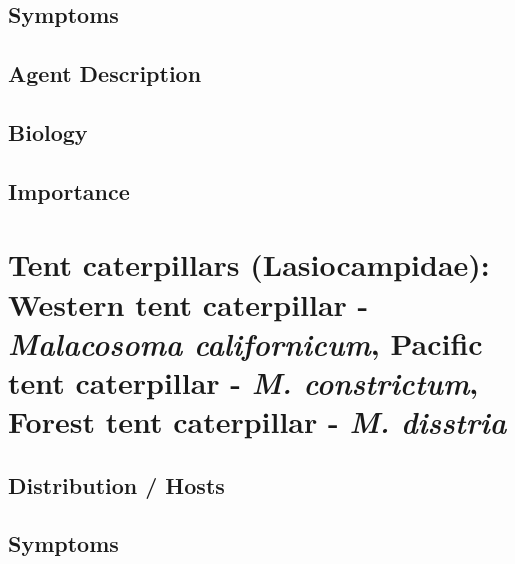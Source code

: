 \documentclass[
]{book}
\begin{document}
\subsection*{Symptoms}\label{symptoms-2}

\subsection*{Agent Description}\label{agent-description-2}

\subsection*{Biology}\label{biology-2}

\subsection*{Importance}\label{importance-2}

\section*{\texorpdfstring{Tent caterpillars (Lasiocampidae): Western tent caterpillar - \emph{Malacosoma californicum}, Pacific tent caterpillar - \emph{M. constrictum}, Forest tent caterpillar - \emph{M. disstria}}{Tent caterpillars (Lasiocampidae): Western tent caterpillar - Malacosoma californicum, Pacific tent caterpillar - M. constrictum, Forest tent caterpillar - M. disstria}}\label{tent-caterpillars-lasiocampidae-western-tent-caterpillar---malacosoma-californicum-pacific-tent-caterpillar---m.-constrictum-forest-tent-caterpillar---m.-disstria}

\subsection*{Distribution / Hosts}\label{distribution-hosts-3}

\subsection*{Symptoms}\label{symptoms-3}
\end{document}
